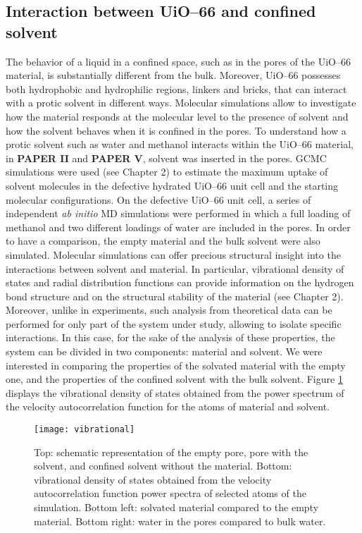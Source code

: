 \subsection*{Interaction between UiO--66 and confined solvent}
The behavior of a liquid in a confined space, such as in the pores of the UiO--66 material, is substantially different from the bulk. Moreover, UiO--66 possesses both hydrophobic and hydrophilic regions, linkers and bricks, that can interact with a protic solvent in different ways. Molecular simulations allow to investigate how the material responds at the molecular level to the presence of solvent and how the solvent behaves when it is confined in the pores.
\npar
To understand how a protic solvent such as water and methanol interacts within the UiO--66 material, in \textbf{PAPER II} and \textbf{PAPER V}, solvent was inserted in the pores. 
GCMC simulations were used (see Chapter 2) to estimate the maximum uptake of solvent molecules in the defective hydrated UiO--66 unit cell and the starting molecular configurations. On the defective UiO--66 unit cell, a series of independent \textit{ab initio} MD simulations were performed in which a full loading of methanol and two different loadings of water are included in the pores. In order to have a comparison, the empty material and the bulk solvent were also simulated.
\npar
Molecular simulations can offer precious structural insight into the interactions between solvent and material. In particular, vibrational density of states and radial distribution functions can provide information on the hydrogen bond structure and on the structural stability of the material (see Chapter 2). Moreover, unlike in experiments, such analysis from theoretical data can be performed for only part of the system under study, allowing to isolate specific interactions. In this case, for the sake of the analysis of these properties, the system can be divided in two components: material and solvent. 
We were interested in comparing the properties of the solvated material with the empty one, and the properties of the confined solvent with the bulk solvent. Figure \ref{fig:vibrational} displays the vibrational density of states obtained from the power spectrum of the velocity autocorrelation function for the atoms of material and solvent. 
\npar
\begin{figure}[!htbp]
	\centering
	\texttt{[image: vibrational]}
	\caption{Top: schematic representation of the empty pore, pore with the solvent, and confined solvent without the material. Bottom: vibrational density of states obtained from the velocity autocorrelation function power spectra of selected atoms of the simulation. Bottom left: solvated material compared to the empty material. Bottom right: water in the pores compared to bulk water.}
	\label{fig:vibrational}
\end{figure}
